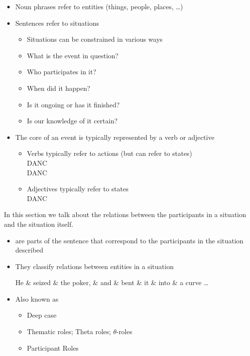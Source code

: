 \documentclass[a4paper,landscape,headrule,footrule,xetex]{foils}
\begin{document}
\begin{itemize}
\item Noun phrases refer to entities (things, people, places, \ldots) 
\item Sentences refer to situations
  \begin{itemize}
  \item Situations can be constrained in various ways
  \item What is the event in question?
  \item Who participates in it?
  \item When did it happen?
  \item Is it ongoing or has it finished?
  \item Is our knowledge of it certain?
  \end{itemize}
\item The core of an event is typically represented by a verb or
  adjective 
  \begin{itemize}
  \item Verbs typically refer to actions (but can refer to states)
    \\  DANC
    \\   DANC
  \item Adjectives typically refer to states
    \\  DANC
  \end{itemize}
\end{itemize}

In this section we talk about the relations between the participants
in a situation and the situation itself.

\begin{itemize}
\item  {} are parts of the sentence that 
correspond to the participants in the situation 
described

\item  They classify relations between entities in a situation
\\[2ex] \begin{dependency}
\begin{deptext}[column sep=1em]
He \& seized \& the poker, \& and \& bent \& it \& into \& a curve \ldots \\ %
\end{deptext}
\end{dependency}
 \newpage
\item  Also known as
\begin{itemize}
\item  Deep case \citep{Fillmore:1968}
\item  Thematic roles; Theta roles;   $\theta$-roles
\item  Participant Roles
\end{itemize}
\end{itemize}
 
\end{document}
